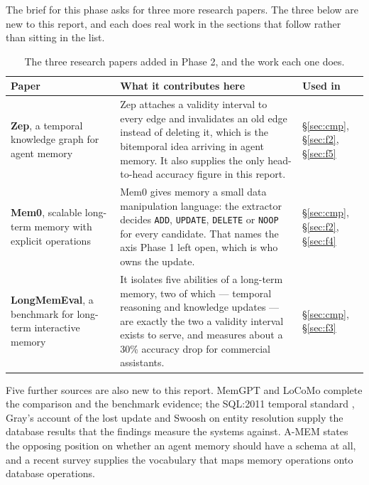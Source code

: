 \documentclass[11pt,a4paper]{article}
\renewcommand{\arraystretch}{1.25}
\newcommand{\code}[1]{\texttt{\small #1}}
\begin{document}
The brief for this phase asks for three more research papers. The three
below are new to this report, and each does real work in the sections
that follow rather than sitting in the list.

\begin{table}[!htbp]
\centering
\caption[The three new research papers]{The three research papers added in Phase 2, and the work each
one does.}
\label{tab:new}
{\footnotesize
\renewcommand{\arraystretch}{1.3}
\begin{tabularx}{\textwidth}{L{3.3cm} Y L{1.5cm}}
\toprule
\sffamily\bfseries Paper & \sffamily\bfseries What it contributes here &
\sffamily\bfseries Used in \\
\midrule
\textbf{Zep}, a temporal knowledge graph for agent memory
\cite{zep,graphiti} &
Zep attaches a validity interval to every edge and invalidates an old
edge instead of deleting it, which is the bitemporal idea arriving in
agent memory. It also supplies the only head-to-head accuracy figure in
this report. &
\S\ref{sec:cmp}, \S\ref{sec:f2}, \S\ref{sec:f5} \\
\textbf{Mem0}, scalable long-term memory with explicit operations
\cite{mem0} &
Mem0 gives memory a small data manipulation language: the extractor
decides \code{ADD}, \code{UPDATE}, \code{DELETE} or \code{NOOP} for every
candidate. That names the axis Phase 1 left open, which is who owns the
update. &
\S\ref{sec:cmp}, \S\ref{sec:f2}, \S\ref{sec:f4} \\
\textbf{LongMemEval}, a benchmark for long-term interactive memory
\cite{longmemeval} &
It isolates five abilities of a long-term memory, two of which ---
temporal reasoning and knowledge updates --- are exactly the two a
validity interval exists to serve, and measures about a 30\% accuracy
drop for commercial assistants. &
\S\ref{sec:cmp}, \S\ref{sec:f3} \\
\bottomrule
\end{tabularx}}
\end{table}

Five further sources are also new to this report. MemGPT \cite{memgpt}
and LoCoMo \cite{locomo} complete the comparison and the benchmark
evidence; the SQL:2011 temporal standard \cite{sql2011}, Gray's account
of the lost update \cite{gray1976} and Swoosh on entity resolution
\cite{swoosh} supply the database results that the findings measure the
systems against. A-MEM \cite{amem} states the opposing position on
whether an agent memory should have a schema at all, and a recent survey
\cite{du2025} supplies the vocabulary that maps memory operations onto
database operations.
\end{document}
